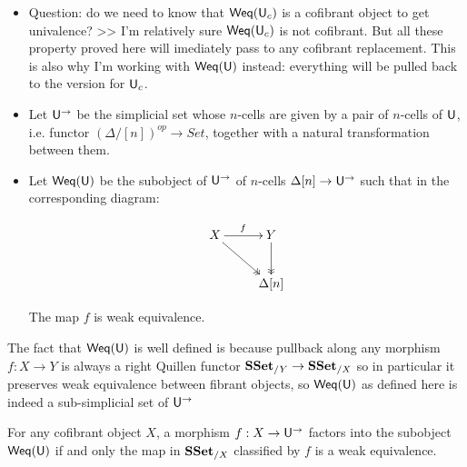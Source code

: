 \documentclass[reqno,10pt,a4paper,oneside,draft]{amsart}
\begin{document}
\begin{itemize}
\item Question: do we need to know that $\mathsf{Weq}(\mathsf{U}_c)$ is a cofibrant object to get univalence? >> I'm relatively sure $\mathsf{Weq}(\mathsf{U}_c)$ is not cofibrant. But all these property proved here will imediately pass to any cofibrant replacement. This is also why I'm working with  $\mathsf{Weq}(\mathsf{U})$ instead: everything will be pulled back to the version for $\mathsf{U}_c$.
\end{itemize}


\begin{definition}
\leavevmode
\begin{itemize}

\item Let $\mathsf{U}^{\rightarrow}$ be the simplicial set whose $n$-cells are given by a pair of $n$-cells of $\mathsf{U}$, i.e. functor $(\Delta/[n])^{op} \rightarrow Set$, together with a natural transformation between them.


\item Let $\mathsf{Weq}(\mathsf{U})$ be the subobject of $\mathsf{U}^{\rightarrow}$ of $n$-cells $\Delta[n] \rightarrow \mathsf{U}^{\rightarrow}$ such that in the corresponding diagram:
 

\[\xymatrix{ X \ar[r]^{f} \ar@{->>}[dr] & Y \ar@{->>}[d] \\
& \Delta[n]
}\]

The map $f$ is weak equivalence.

\end{itemize}

\end{definition}


The fact that $\mathsf{Weq}(\mathsf{U})$ is well defined is because pullback along any morphism $f:X \rightarrow Y$ is always a right Quillen functor $\mathbf{SSet}_{/Y} \rightarrow \mathbf{SSet}_{/X}$ so in particular it preserves weak equivalence between fibrant objects, so $\mathsf{Weq}(\mathsf{U})$ as defined here is indeed a sub-simplicial set of $\mathsf{U}^{\rightarrow}$

\begin{proposition}
\label{prop:Weq_classify_Weq}
For any cofibrant object $X$, a morphism $f:X \rightarrow \mathsf{U}^{\rightarrow}$ factors into the subobject $\mathsf{Weq}(\mathsf{U})$ if and only the map in $\mathbf{SSet}_{/X}$ classified by $f$ is a weak equivalence.

\end{proposition}
\end{document}
